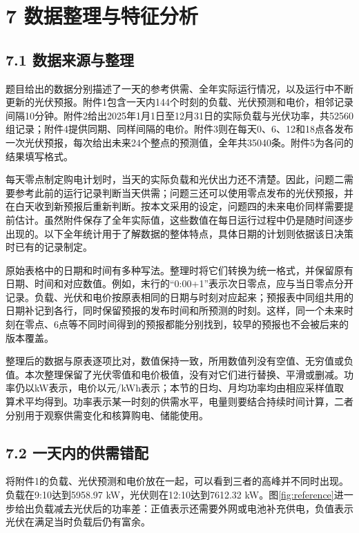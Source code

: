 \documentclass[11pt,a4paper]{article}
\begin{document}
\section*{7 数据整理与特征分析}

\subsection*{7.1 数据来源与整理}

题目给出的数据分别描述了一天的参考供需、全年实际运行情况，以及运行中不断更新的光伏预报。附件1包含一天内144个时刻的负载、光伏预测和电价，相邻记录间隔10分钟。附件2给出2025年1月1日至12月31日的实际负载与光伏功率，共52560组记录；附件4提供同期、同样间隔的电价。附件3则在每天0、6、12和18点各发布一次光伏预报，每次给出未来24个整点的预测值，全年共35040条。附件5为各问的结果填写格式。

每天零点制定购电计划时，当天的实际负载和光伏出力还不清楚。因此，问题二需要参考此前的运行记录判断当天供需；问题三还可以使用零点发布的光伏预报，并在白天收到新预报后重新判断。按本文采用的设定，问题四的未来电价同样需要提前估计。虽然附件保存了全年实际值，这些数值在每日运行过程中仍是随时间逐步出现的。以下全年统计用于了解数据的整体特点，具体日期的计划则依据该日决策时已有的记录制定。

原始表格中的日期和时间有多种写法。整理时将它们转换为统一格式，并保留原有日期、时间和对应数值。例如，末行的“0:00+1”表示次日零点，应与当日零点分开记录。负载、光伏和电价按原表相同的日期与时刻对应起来；预报表中同组共用的日期补记到各行，同时保留预报的发布时间和所预测的时刻。这样，同一个未来时刻在零点、6点等不同时间得到的预报都能分别找到，较早的预报也不会被后来的版本覆盖。

整理后的数据与原表逐项比对，数值保持一致，所用数值列没有空值、无穷值或负值。本次整理保留了光伏零值和电价极值，没有对它们进行替换、平滑或删减。功率仍以kW表示，电价以元/kWh表示；本节的日均、月均功率均由相应采样值取算术平均得到。功率表示某一时刻的供需水平，电量则要结合持续时间计算，二者分别用于观察供需变化和核算购电、储能使用。

\subsection*{7.2 一天内的供需错配}

将附件1的负载、光伏预测和电价放在一起，可以看到三者的高峰并不同时出现。负载在9:10达到5958.97 kW，光伏则在12:10达到7612.32 kW。图\ref{fig:reference}进一步给出负载减去光伏后的功率差：正值表示还需要外网或电池补充供电，负值表示光伏在满足当时负载后仍有富余。
\end{document}
